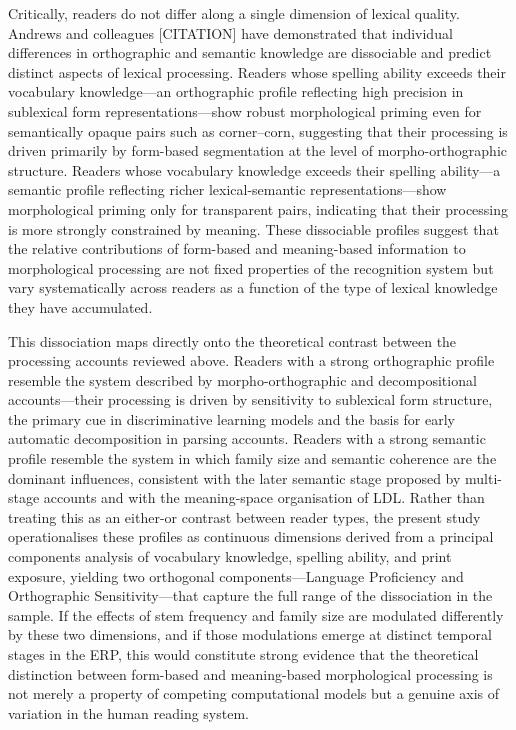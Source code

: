 \documentclass[utf8]{FrontiersinHarvard} %
\begin{document}
Critically, readers do not differ along a single dimension of lexical quality. Andrews and colleagues [CITATION] have demonstrated that individual differences in orthographic and semantic knowledge are dissociable and predict distinct aspects of lexical processing. Readers whose spelling ability exceeds their vocabulary knowledge—an orthographic profile reflecting high precision in sublexical form representations—show robust morphological priming even for semantically opaque pairs such as corner–corn, suggesting that their processing is driven primarily by form-based segmentation at the level of morpho-orthographic structure. Readers whose vocabulary knowledge exceeds their spelling ability—a semantic profile reflecting richer lexical-semantic representations—show morphological priming only for transparent pairs, indicating that their processing is more strongly constrained by meaning. These dissociable profiles suggest that the relative contributions of form-based and meaning-based information to morphological processing are not fixed properties of the recognition system but vary systematically across readers as a function of the type of lexical knowledge they have accumulated.

This dissociation maps directly onto the theoretical contrast between the processing accounts reviewed above. Readers with a strong orthographic profile resemble the system described by morpho-orthographic and decompositional accounts—their processing is driven by sensitivity to sublexical form structure, the primary cue in discriminative learning models and the basis for early automatic decomposition in parsing accounts. Readers with a strong semantic profile resemble the system in which family size and semantic coherence are the dominant influences, consistent with the later semantic stage proposed by multi-stage accounts and with the meaning-space organisation of LDL. Rather than treating this as an either-or contrast between reader types, the present study operationalises these profiles as continuous dimensions derived from a principal components analysis of vocabulary knowledge, spelling ability, and print exposure, yielding two orthogonal components—Language Proficiency and Orthographic Sensitivity—that capture the full range of the dissociation in the sample. If the effects of stem frequency and family size are modulated differently by these two dimensions, and if those modulations emerge at distinct temporal stages in the ERP, this would constitute strong evidence that the theoretical distinction between form-based and meaning-based morphological processing is not merely a property of competing computational models but a genuine axis of variation in the human reading system.
\end{document}
